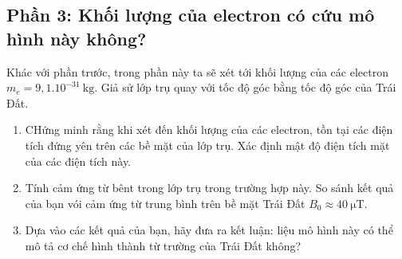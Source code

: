 \subsection*{Phần 3: Khối lượng của electron có cứu mô hình này không?}
\noindent Khác với phần trước, trong phần này ta sẽ xét tới khối lượng của các electron $m_{e}=9,1.10^{-31}\SI{}{\kilogram}$. Giả sử lớp trụ quay với tốc độ góc bằng tốc độ góc của Trái Đất.
\begin{enumerate}
  \item CHứng minh rằng khi xét đến khối lượng của các electron, tồn tại các điện tích đứng yên trên các bề mặt của lớp trụ. Xác định mật độ điện tích mặt của các điện tích này.
  \item Tính cảm ứng từ bênt trong lớp trụ trong trường hợp này. So sánh kết quả của bạn vói cảm ứng từ trung bình trên bề mặt Trái Đất $B_{0}\approx\SI{40}{\micro\tesla}$.
  \item Dựa vào các kết quả của bạn, hãy đưa ra kết luận: liệu mô hình này có thể mô tả cơ chế hình thành từ trường của Trái Đất không?
\end{enumerate}
